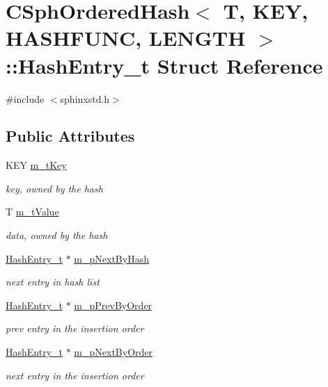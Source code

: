\hypertarget{structCSphOrderedHash_1_1HashEntry__t}{\section{C\-Sph\-Ordered\-Hash$<$ T, K\-E\-Y, H\-A\-S\-H\-F\-U\-N\-C, L\-E\-N\-G\-T\-H $>$\-:\-:Hash\-Entry\-\_\-t Struct Reference}
\label{structCSphOrderedHash_1_1HashEntry__t}
}


{\ttfamily \#include $<$sphinxstd.\-h$>$}

\subsection*{Public Attributes}
\begin{DoxyCompactItemize}
\item 
K\-E\-Y \hyperlink{structCSphOrderedHash_1_1HashEntry__t_a0080a4842b4734407c5312a9e891e257}{m\-\_\-t\-Key}
\begin{DoxyCompactList}\small\item\em key, owned by the hash \end{DoxyCompactList}\item 
T \hyperlink{structCSphOrderedHash_1_1HashEntry__t_ad78ef6471453564c5ada53bdbb525e96}{m\-\_\-t\-Value}
\begin{DoxyCompactList}\small\item\em data, owned by the hash \end{DoxyCompactList}\item 
\hyperlink{structCSphOrderedHash_1_1HashEntry__t}{Hash\-Entry\-\_\-t} $\ast$ \hyperlink{structCSphOrderedHash_1_1HashEntry__t_ac73b47e334405ccbb2aa0b2ebe0cc81f}{m\-\_\-p\-Next\-By\-Hash}
\begin{DoxyCompactList}\small\item\em next entry in hash list \end{DoxyCompactList}\item 
\hyperlink{structCSphOrderedHash_1_1HashEntry__t}{Hash\-Entry\-\_\-t} $\ast$ \hyperlink{structCSphOrderedHash_1_1HashEntry__t_a8a44ee80cf2427a9395d5bfabf8ca352}{m\-\_\-p\-Prev\-By\-Order}
\begin{DoxyCompactList}\small\item\em prev entry in the insertion order \end{DoxyCompactList}\item 
\hyperlink{structCSphOrderedHash_1_1HashEntry__t}{Hash\-Entry\-\_\-t} $\ast$ \hyperlink{structCSphOrderedHash_1_1HashEntry__t_a33f5467c92bbc1824d35980197ef2ecd}{m\-\_\-p\-Next\-By\-Order}
\begin{DoxyCompactList}\small\item\em next entry in the insertion order \end{DoxyCompactList}\end{DoxyCompactItemize}



